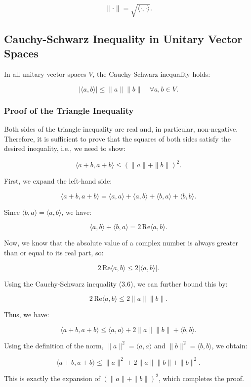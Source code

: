 \[
\| \cdot \| = \sqrt{\langle \cdot, \cdot \rangle}.
\]

\subsection{Cauchy-Schwarz Inequality in Unitary Vector Spaces}

In all unitary vector spaces \( V \), the Cauchy-Schwarz inequality holds:

\[
| \langle a, b \rangle | \leq \| a \| \| b \| \quad \forall a, b \in V.
\]
\subsubsection*{Proof of the Triangle Inequality}

Both sides of the triangle inequality are real and, in particular, non-negative. Therefore, it is sufficient to prove that the squares of both sides satisfy the desired inequality, i.e., we need to show:

\[
\langle a + b, a + b \rangle \leq (\|a\| + \|b\|)^2.
\]

First, we expand the left-hand side:

\[
\langle a + b, a + b \rangle = \langle a, a \rangle + \langle a, b \rangle + \langle b, a \rangle + \langle b, b \rangle.
\]

Since \( \langle b, a \rangle = \langle a, b \rangle \), we have:

\[
\langle a, b \rangle + \langle b, a \rangle = 2 \, \text{Re} \langle a, b \rangle.
\]

Now, we know that the absolute value of a complex number is always greater than or equal to its real part, so:

\[
2 \, \text{Re} \langle a, b \rangle \leq 2 |\langle a, b \rangle|.
\]

Using the Cauchy-Schwarz inequality (3.6), we can further bound this by:

\[
2 \, \text{Re} \langle a, b \rangle \leq 2 \|a\| \|b\|.
\]

Thus, we have:

\[
\langle a + b, a + b \rangle \leq \langle a, a \rangle + 2 \|a\| \|b\| + \langle b, b \rangle.
\]

Using the definition of the norm, \( \|a\|^2 = \langle a, a \rangle \) and \( \|b\|^2 = \langle b, b \rangle \), we obtain:

\[
\langle a + b, a + b \rangle \leq \|a\|^2 + 2 \|a\| \|b\| + \|b\|^2.
\]

This is exactly the expansion of \( (\|a\| + \|b\|)^2 \), which completes the proof.

\newpage

